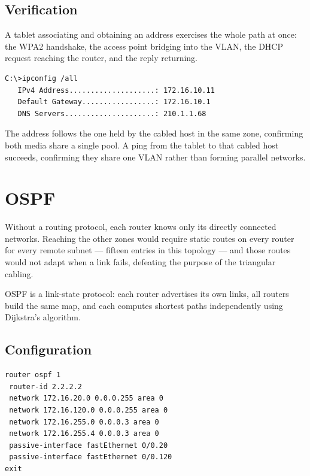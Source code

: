 \documentclass[12pt,a4paper]{article}
\begin{document}
\subsection{Verification}

A tablet associating and obtaining an address exercises the whole path at once:
the WPA2 handshake, the access point bridging into the VLAN, the DHCP request
reaching the router, and the reply returning.

\begin{lstlisting}
C:\>ipconfig /all
   IPv4 Address....................: 172.16.10.11
   Default Gateway.................: 172.16.10.1
   DNS Servers.....................: 210.1.1.68
\end{lstlisting}

The address follows the one held by the cabled host in the same zone, confirming
both media share a single pool. A ping from the tablet to that cabled host
succeeds, confirming they share one VLAN rather than forming parallel networks.

\section{OSPF}

Without a routing protocol, each router knows only its directly connected
networks. Reaching the other zones would require static routes on every router
for every remote subnet --- fifteen entries in this topology --- and those routes
would not adapt when a link fails, defeating the purpose of the triangular
cabling.

OSPF is a link-state protocol: each router advertises its own links, all routers
build the same map, and each computes shortest paths independently using
Dijkstra's algorithm.

\subsection{Configuration}

\begin{lstlisting}
router ospf 1
 router-id 2.2.2.2
 network 172.16.20.0 0.0.0.255 area 0
 network 172.16.120.0 0.0.0.255 area 0
 network 172.16.255.0 0.0.0.3 area 0
 network 172.16.255.4 0.0.0.3 area 0
 passive-interface fastEthernet 0/0.20
 passive-interface fastEthernet 0/0.120
exit
\end{lstlisting}
\end{document}
